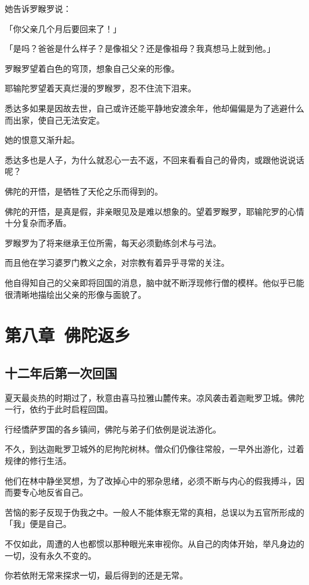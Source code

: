 \documentclass[twoside,openany]{book}
\begin{document}
她告诉罗睺罗说：

「你父亲几个月后要回来了！」

「是吗？爸爸是什么样子？是像祖父？还是像祖母？我真想马上就到他。」

罗睺罗望着白色的穹顶，想象自己父亲的形像。

耶输陀罗望着天真烂漫的罗睺罗，忍不住流下泪来。

悉达多如果是因故去世，自己或许还能平静地安渡余年，他却偏偏是为了逃避什么而出家，使自己无法安定。

她的恨意又渐升起。

悉达多也是人子，为什么就忍心一去不返，不回来看看自己的骨肉，或跟他说说话呢？

佛陀的开悟，是牺牲了天伦之乐而得到的。

佛陀的开悟，是真是假，非亲眼见及是难以想象的。望着罗睺罗，耶输陀罗的心情十分复杂而矛盾。

罗睺罗为了将来继承王位所需，每天必须勤练剑术与弓法。

而且他在学习婆罗门教义之余，对宗教有着异乎寻常的关注。

他自得知自己的父亲即将回国的消息，脑中就不断浮现修行僧的模样。他似乎已能很清晰地描绘出父亲的形像与面貌了。



\chapter{第八章\ 佛陀返乡}\label{ch8}

\section{十二年后第一次回国}\label{sec8.1}

夏天最炎热的时期过了，秋意由喜马拉雅山麓传来。凉风袭击着迦毗罗卫城。佛陀一行，依约于此时启程回国。

行经憍萨罗国的各乡镇间，佛陀与弟子们依例是说法游化。

不久，到达迦毗罗卫城外的尼拘陀树林。僧众们仍像往常般，一早外出游化，过着规律的修行生活。

他们在林中静坐冥想，为了改掉心中的邪杂思绪，必须不断与内心的假我搏斗，因而要专心地反省自己。

苦恼的影子反现于伪我之中。一般人不能体察无常的真相，总误以为五官所形成的「我」便是自己。

不仅如此，周遭的人也都惯以那种眼光来审视你。从自己的肉体开始，举凡身边的一切，没有永久不变的。

你若依附无常来探求一切，最后得到的还是无常。
\end{document}
